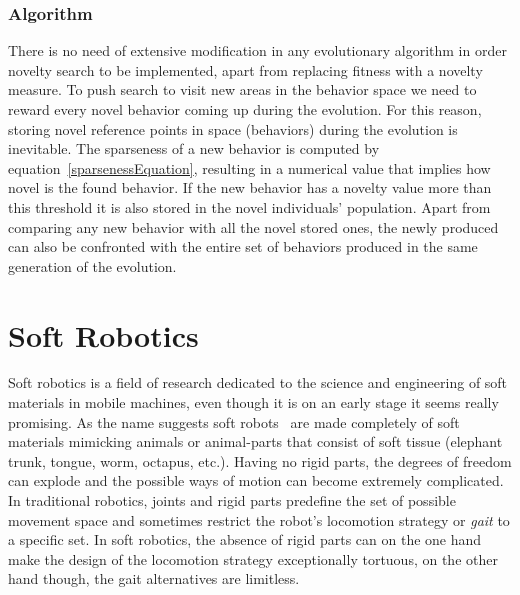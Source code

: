 \subsubsection*{Algorithm}

There is no need of extensive modification in any evolutionary algorithm in order novelty search to be implemented, apart from replacing fitness with a novelty measure. To push search to visit new areas in the behavior space we need to reward every novel behavior coming up during the evolution. For this reason, storing novel reference points in space (behaviors) during the evolution is inevitable. The sparseness of a new behavior is computed by equation~\ref{sparsenessEquation}, resulting in a numerical value that implies how novel is the found behavior. If the new behavior has a novelty value more than this threshold it is also stored in the novel individuals' population. Apart from comparing any new behavior with all the novel stored ones, the newly produced can also be confronted with the entire set of behaviors produced in the same generation of the evolution.



\section{Soft Robotics}
Soft robotics is a field of research dedicated to the science and engineering of soft materials in mobile machines, even though it is on an early stage it seems really promising. As the name suggests soft robots~\cite{trivedi2008soft, pfeifer2012challenges} are made completely of soft materials mimicking animals or animal-parts that consist of soft tissue (elephant trunk, tongue, worm, octapus, etc.). Having no rigid parts, the degrees of freedom can explode and the possible ways of motion can become extremely complicated. In traditional robotics, joints and rigid parts predefine the set of possible movement space and sometimes restrict the robot's locomotion strategy or \emph{gait} to a specific set. In soft robotics, the absence of rigid parts can on the one hand make the design of the locomotion strategy exceptionally tortuous, on the other hand though, the gait alternatives are limitless.

